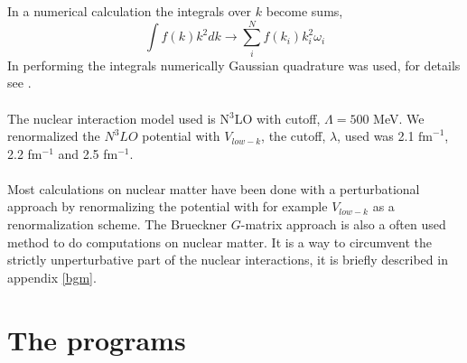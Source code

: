 In a numerical calculation the integrals over $k$ become sums, 
\begin{equation*}
		\int f(k)k^2dk \rightarrow \sum_i^N f(k_i)k^2_i\omega _i
\end{equation*}
In performing the integrals numerically Gaussian quadrature was used, for details see \cite{compphys-mhjensen}.\\
\\
The nuclear interaction model used is N$^3$LO \cite{entem-2003-68} with cutoff, 
$\Lambda=500$ MeV. We
renormalized the $N^3LO$ potential with $V_{low-k}$, the cutoff,  $\lambda$, 
used was 2.1 $\mbox{fm}^{-1}$, 2.2 fm$^{-1}$ and 2.5 fm$^{-1}$.\\
\\
Most calculations on nuclear matter have been done with a
perturbational approach by renormalizing the potential with for example  $V_{low-k}$ as a
renormalization scheme. The Brueckner $G$-matrix approach is also a often used method to do computations on nuclear matter. It is a way to circumvent
the strictly unperturbative part of the nuclear interactions, it is briefly described
in appendix \ref{bgm}.  
\\
\section{The programs}

